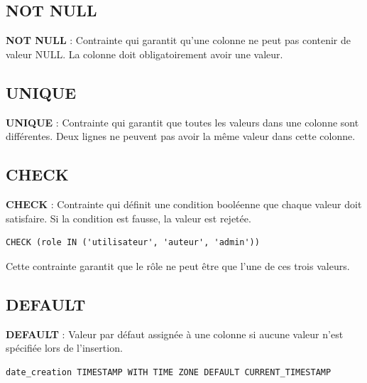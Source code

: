 \subsection{NOT NULL}

\begin{definitionbox}
    \textbf{NOT NULL} : Contrainte qui garantit qu'une colonne ne peut pas contenir de valeur NULL. La colonne doit obligatoirement avoir une valeur.
\end{definitionbox}

\subsection{UNIQUE}

\begin{definitionbox}
    \textbf{UNIQUE} : Contrainte qui garantit que toutes les valeurs dans une colonne sont différentes. Deux lignes ne peuvent pas avoir la même valeur dans cette colonne.
\end{definitionbox}

\subsection{CHECK}

\begin{definitionbox}
    \textbf{CHECK} : Contrainte qui définit une condition booléenne que chaque valeur doit satisfaire. Si la condition est fausse, la valeur est rejetée.
\end{definitionbox}

\begin{lstlisting}[style=sql]
CHECK (role IN ('utilisateur', 'auteur', 'admin'))
\end{lstlisting}

Cette contrainte garantit que le rôle ne peut être que l'une de ces trois valeurs.

\subsection{DEFAULT}

\begin{definitionbox}
    \textbf{DEFAULT} : Valeur par défaut assignée à une colonne si aucune valeur n'est spécifiée lors de l'insertion.
\end{definitionbox}

\begin{lstlisting}[style=sql]
date_creation TIMESTAMP WITH TIME ZONE DEFAULT CURRENT_TIMESTAMP
\end{lstlisting}

